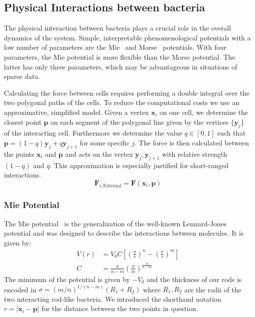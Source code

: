 \documentclass[10pt,letterpaper]{article}
\renewcommand{\vec}[1]{\mathbf{#1}}
\begin{document}
\subsection{Physical Interactions between bacteria}

The physical interaction between bacteria plays a crucial role in the overall dynamics of the
system.
Simple, interpretable phenomenological potentials with a low number of parameters are the
Mie~\cite{Mie1903} and Morse~\cite{Morse1929,Kang2014,Breitwieser2021} potentials.
With four parameters, the Mie potential is more flexible than the Morse potential.
The latter has only three parameters, which may be advantageous in situations of sparse data.

Calculating the force between cells requires performing a double integral over the two polygonal
paths of the cells.
To reduce the computational costs we use an approximative, simplified model.
Given a vertex $\vec{x}_i$ on one cell, we determine the closest point $\vec{p}$ on each segment of
the polygonal line given by the vertices $\{\vec{y}_j\}$ of the interacting cell.
Furthermore we determine the value $q\in[0,1]$ such that $\vec{p} = (1-q)\vec{y}_j + q\vec{y}_{j+1}$
for some specific $j$.
The force is then calculated between the points $\vec{x}_i$ and $\vec{p}$ and acts on the vertex
$\vec{y}_j,\vec{y}_{j+1}$ with relative strength $(1-q)$ and $q$.
This approximation is especially justified for short-ranged interactions.
\begin{equation}
    \vec{F}_{i,\text{External}} = \vec{F}(\vec{x}_i,\vec{p})
\end{equation}
\subsubsection{Mie Potential}

The Mie potential~\cite{Mie1903} is the generalization of the well-known
Lennard-Jones~\cite{Jones1924} potential and was designed to describe the interactions between
molecules.
It is given by:
\begin{align}
    V(r) &= V_0C\left[ \left(\frac{\sigma}{r}\right)^n -
        \left(\frac{\sigma}{r}\right)^m\right]\\
    C &= \frac{n}{n-m}\left(\frac{n}{m}\right)^{\frac{n}{n-m}}
\end{align}
The minimum of the potential is given by $-V_0$ and the thickness of our rods is encoded in
$\sigma = (m/n)^{1/(n-m)}(R_1+R_2)$ where $R_1,R_2$ are the radii of the two interacting rod-like
bacteria.
We introduced the shorthand notation $r=|\vec{x}_i - \vec{p}|$ for the distance between the two
points in question.
\end{document}
